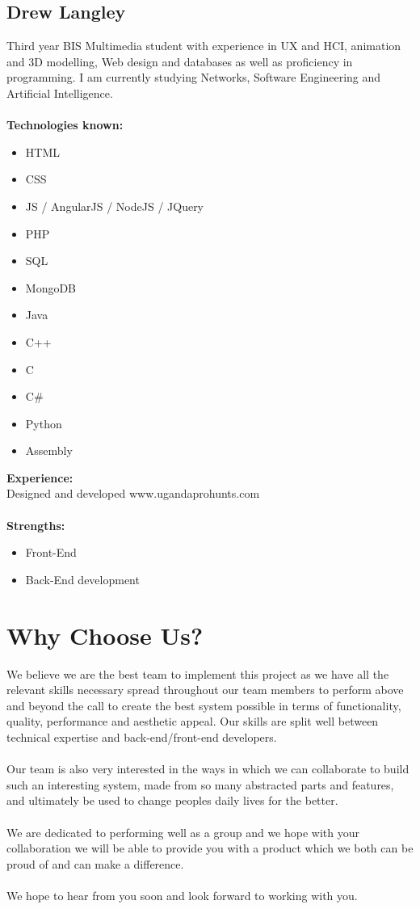 \documentclass{article}
\begin{document}
\subsection {Drew Langley}
Third year BIS Multimedia student with experience in UX and HCI, animation and 3D modelling, Web design and databases as well as proficiency in programming. I am currently studying Networks, Software Engineering and Artificial Intelligence. \\ \\
\textbf{Technologies known:}
\begin{itemize}
	\item HTML
	\item CSS 
	\item JS / AngularJS / NodeJS / JQuery 
	\item PHP 
	\item SQL
	\item MongoDB
	\item Java 
	\item C++ 
	\item C 
	\item C\# 
	\item Python 
	\item Assembly
\end{itemize}
\textbf{Experience:} \\
Designed and developed www.ugandaprohunts.com
\\ \\
\textbf{Strengths:} 
\begin{itemize}
	\item Front-End
	\item Back-End development
\end{itemize}

\newpage
\section{Why Choose Us?}
	We believe we are the best team to implement this project as we have all the relevant skills necessary spread throughout our team members to perform above and beyond the call to create the best system possible in terms of functionality, quality, performance and aesthetic appeal. Our skills are split well between technical expertise and back-end/front-end developers.\\ \\
	Our team is also very interested in the ways in which we can collaborate to build such an interesting system, made from so many abstracted parts and features, and ultimately be used to change peoples daily lives for the better.\\ \\
	We are dedicated to performing well as a group and we hope with your collaboration we will be able to provide you with a product which we both can be proud of and can make a difference. \\ \\
    We hope to hear from you soon and look forward to working with you.
\end{document}
